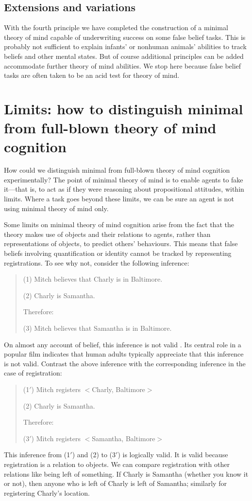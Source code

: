 \documentclass[12pt,\papersize]{extarticle}
\begin{document}
\subsection{Extensions and variations}
With the fourth principle we have completed the construction of a minimal theory of mind capable of underwriting success on some false belief tasks.  
This is probably not sufficient to explain infants' or nonhuman animals' abilities to track beliefs and other mental states.
But of course additional principles can be added accommodate further theory of mind abilities.  
We stop here because false belief tasks are often taken to be an acid test for theory of mind.



\section{Limits: how to distinguish minimal from full-blown theory of mind cognition}
\label{sec:limits1}
How could we distinguish minimal from full-blown theory of mind cognition experimentally?  The point of minimal theory of mind is to enable agents to fake it—that is, to act as if they were reasoning about propositional attitudes, within limits.  Where a task goes beyond these limits, we can be sure an agent is not using minimal theory of mind only.

Some limits on minimal theory of mind cognition arise from the fact that the theory makes use of objects and their relations to agents, rather than representations of objects, to predict others’ behaviours.  This means that false beliefs involving quantification or identity cannot be tracked by representing registrations.  To see why not, consider the following inference:
%
\begin{quote}
(1) Mitch believes that Charly is in Baltimore.

(2) Charly is Samantha.

Therefore:

(3) Mitch believes that Samantha is in Baltimore.
\end{quote}
%
On almost any account of belief, this inference is not valid
\citep[][pp.\ 214-5]{frege:1948_sense}.  Its central role in a popular film \citep[]{en_1793} indicates that human adults typically appreciate that this inference is not valid.  Contrast the above inference with the corresponding inference in the case of registration:
%
\begin{quote}
(1$'$) Mitch registers \(<\)Charly, Baltimore\(>\)

(2) Charly is Samantha.

Therefore:

(3$'$) Mitch registers \(<\)Samantha, Baltimore\(>\)
\end{quote}
%
This inference from (1$'$) and (2) to (3$'$) is logically valid.  It is valid because registration is a relation to objects.  We can compare registration with other relations like being left of something.  If Charly is Samantha (whether you know it or not), then anyone who is left of Charly is left of Samantha; similarly for registering Charly’s location. 
\end{document}
